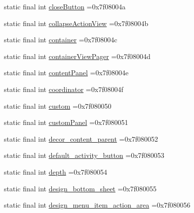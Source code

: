 \begin{DoxyCompactItemize}
\item 
static final int \mbox{\hyperlink{classcom_1_1example_1_1trainawearapplication_1_1_r_1_1id_a4df9a6a1faa14a939a150bb053daf823}{close\+Button}} =0x7f08004a
\item 
static final int \mbox{\hyperlink{classcom_1_1example_1_1trainawearapplication_1_1_r_1_1id_ab9d94f396c0fe51c45f88b12b5020167}{collapse\+Action\+View}} =0x7f08004b
\item 
static final int \mbox{\hyperlink{classcom_1_1example_1_1trainawearapplication_1_1_r_1_1id_a098ca51bf57d918825880bb2cf3e8a24}{container}} =0x7f08004c
\item 
static final int \mbox{\hyperlink{classcom_1_1example_1_1trainawearapplication_1_1_r_1_1id_aaa9aa19c2dea0875339dca2b2e2ef7ce}{container\+View\+Pager}} =0x7f08004d
\item 
static final int \mbox{\hyperlink{classcom_1_1example_1_1trainawearapplication_1_1_r_1_1id_aabcd606aa15c9203ea1468ba20b69ca4}{content\+Panel}} =0x7f08004e
\item 
static final int \mbox{\hyperlink{classcom_1_1example_1_1trainawearapplication_1_1_r_1_1id_abb595053992560987c7cf4dce39efe78}{coordinator}} =0x7f08004f
\item 
static final int \mbox{\hyperlink{classcom_1_1example_1_1trainawearapplication_1_1_r_1_1id_a56de96451be85f57bdf15d16989b599d}{custom}} =0x7f080050
\item 
static final int \mbox{\hyperlink{classcom_1_1example_1_1trainawearapplication_1_1_r_1_1id_a0fafc6b4614fe1c326f9ad6a0828d45a}{custom\+Panel}} =0x7f080051
\item 
static final int \mbox{\hyperlink{classcom_1_1example_1_1trainawearapplication_1_1_r_1_1id_a44c9c8edd672db527454af0d15dccd7f}{decor\+\_\+content\+\_\+parent}} =0x7f080052
\item 
static final int \mbox{\hyperlink{classcom_1_1example_1_1trainawearapplication_1_1_r_1_1id_a26b3321d83f74c746f7689cebbfe72d4}{default\+\_\+activity\+\_\+button}} =0x7f080053
\item 
static final int \mbox{\hyperlink{classcom_1_1example_1_1trainawearapplication_1_1_r_1_1id_a4109b4e2eb535b8d22127966799643ac}{depth}} =0x7f080054
\item 
static final int \mbox{\hyperlink{classcom_1_1example_1_1trainawearapplication_1_1_r_1_1id_aba0dff1574cc8f2695708fff7d1adc92}{design\+\_\+bottom\+\_\+sheet}} =0x7f080055
\item 
static final int \mbox{\hyperlink{classcom_1_1example_1_1trainawearapplication_1_1_r_1_1id_a13fd2c90238aa64097642d117929c8f2}{design\+\_\+menu\+\_\+item\+\_\+action\+\_\+area}} =0x7f080056

\end{DoxyCompactItemize}
